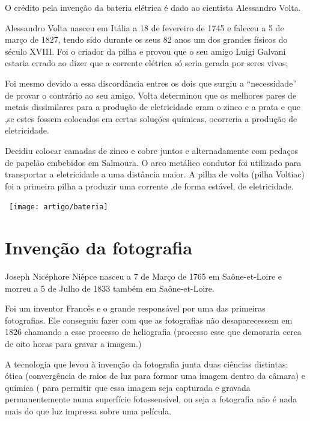 \documentclass{report}
\begin{document}
O crédito pela invenção da bateria elétrica é dado ao cientista Alessandro Volta.

Alessandro Volta nasceu em Itália a 18 de fevereiro de 1745 e faleceu a 5 de março de 1827, tendo sido durante os seus 82 anos um dos grandes físicos do século XVIII. Foi o criador da pilha e provou que o seu amigo Luigi Galvani estaria errado ao dizer que a corrente elétrica só seria gerada por seres vivos;

Foi mesmo devido a essa discordância entres os dois que surgiu a “necessidade” de provar o contrário ao seu amigo. Volta determinou que os melhores pares de metais dissimilares para a produção de eletricidade eram o zinco e a prata e que ,se estes fossem colocados em certas soluções químicas, ocorreria a produção de eletricidade.

Decidiu colocar camadas de zinco e cobre juntos e alternadamente com pedaços de papelão embebidos em Salmoura. O arco metálico condutor foi utilizado para transportar a eletricidade a uma distância maior. A pilha de volta (pilha Voltiac) foi a primeira pilha a produzir uma corrente ,de forma estável, de eletricidade.

\begin{center}
\ \texttt{[image: artigo/bateria]}
\end{center}
 \begin{figure}[h]
 	\centerline{}
 \end{figure}


\chapter{Invenção da fotografia}
 Joseph Nicéphore Niépce nasceu a 7 de Março de 1765 em Saône-et-Loire e morreu a 5 de Julho de 1833 também em Saône-et-Loire. 
 
 Foi um inventor Francês e o grande responsável por uma das primeiras fotografias. Ele conseguiu fazer com que as fotografias não desaparecessem em 1826 chamando a esse processo de heliografia (processo esse que demoraria cerca de oito horas para gravar a imagem.)

A tecnologia que levou à invenção da fotografia junta duas ciências distintas: ótica (convergência de raios de luz para formar uma imagem dentro da câmara) e química ( para permitir que essa imagem seja capturada e gravada permanentemente numa superfície fotossensível, ou seja a fotografia não é nada mais do que luz impressa sobre uma película. 
\end{document}
